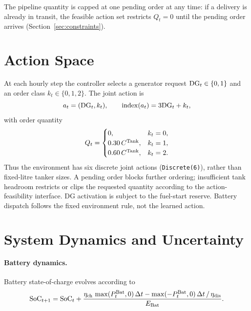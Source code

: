 The pipeline quantity is capped at one pending order at any time: if a
delivery is already in transit, the feasible action set restricts $Q_t = 0$
until the pending order arrives (Section~\ref{sec:constraints}).

\section{Action Space}
\label{sec:action}

\begin{revisedblock}
At each hourly step the controller selects a generator request
$\mathrm{DG}_t\in\{0,1\}$ and an order class $k_t\in\{0,1,2\}$.
The joint action is
\begin{equation}
a_t=(\mathrm{DG}_t,k_t),\qquad
\operatorname{index}(a_t)=3\mathrm{DG}_t+k_t,
\label{eq:action}
\end{equation}
with order quantity
\[
Q_t=\begin{cases}
0,&k_t=0,\\
0.30\,C^{\mathrm{Tank}},&k_t=1,\\
0.60\,C^{\mathrm{Tank}},&k_t=2.
\end{cases}
\]
Thus the environment has six discrete joint actions
(\texttt{Discrete(6)}), rather than fixed-litre tanker sizes.
A pending order blocks further ordering; insufficient tank
headroom restricts or clips the requested quantity according to
the action-feasibility interface. DG activation is subject to the
fuel-start reserve. Battery dispatch follows the fixed environment
rule, not the learned action.
\end{revisedblock}

\section{System Dynamics and Uncertainty}
\label{sec:dynamics}

\paragraph{Battery dynamics.}
Battery state-of-charge evolves according to
\begin{equation}
\mathrm{SoC}_{t+1} = \mathrm{SoC}_t
  + \frac{\eta_{\mathrm{ch}}\,\max(P_t^{\mathrm{Bat}},0)\,\Delta t
          - \max(-P_t^{\mathrm{Bat}},0)\,\Delta t\,/\,\eta_{\mathrm{dis}}}
         {E_{\mathrm{Bat}}}.
\label{eq:soc}
\end{equation}
